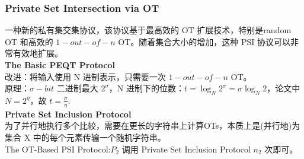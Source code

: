 \subsubsection{Private Set Intersection via OT}
一种新的私有集交集协议，该协议基于最高效的 OT 扩展技术，特别是random OT 和高效的 $1-out-of-n$ OT。随着集合大小的增加，这种 PSI 协议可以非常有效地扩展。\\
\textbf{The Basic PEQT Protocol}\\
改进：将输入使用 N 进制表示，只需要一次 $1-out-of-n$ OT。\\
  原理：$\sigma-bit$ 二进制最大 $2^\sigma$，N 进制下的位数：$t=\log_N2^\sigma=\sigma\log_N2$，论文中 $N=2^\eta$，故 $t=\frac{\sigma}{\eta}$.\\
 \textbf{ Private Set Inclusion Protocol}\\
 为了并行地执行多个比较，需要在更长的字符串上计算OTs，本质上是(并行地)为集合 X 中的每个元素传输一个随机字符串。\\
 The OT-Based PSI Protocol:$P_2$ 调用 Private Set Inclusion Protocol $n_2$ 次即可。